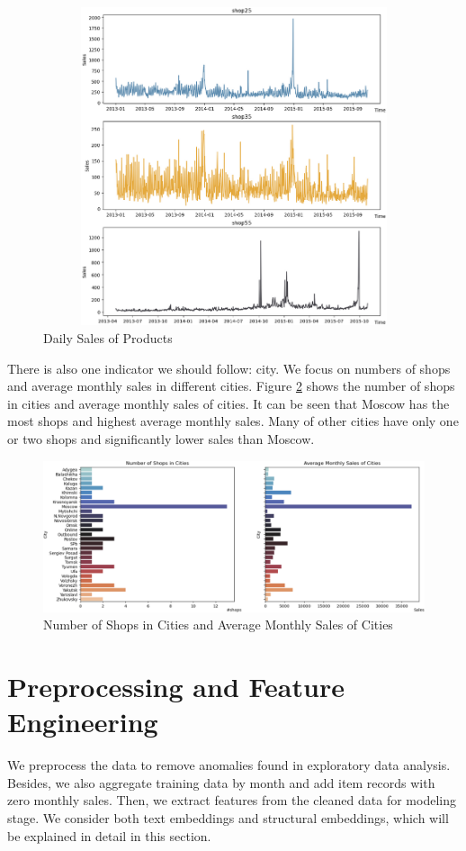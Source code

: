 \documentclass{article}
\begin{document}
\begin{figure}[!ht]
    \centering
    \includegraphics[width=12cm, height=9.35cm]{./figs/shop-sales.png}
    \caption{Daily Sales of Products}
    \label{fig:shop-sales}
\end{figure}

There is also one indicator we should follow: city. We focus on numbers of shops and average monthly sales in different cities. Figure \ref{fig:city} shows the number of shops in cities and average monthly sales of cities. It can be seen that Moscow has the most shops and highest average monthly sales. Many of other cities have only one or two shops and significantly lower sales than Moscow.

\begin{figure}[!ht]
    \centering
    \includegraphics[width=16.5cm]{./figs/city-sales.png}
    \caption{Number of Shops in Cities and Average Monthly Sales of Cities}
    \label{fig:city}
\end{figure}

\section{Preprocessing and Feature Engineering}
We preprocess the data to remove anomalies found in exploratory data analysis. Besides, we also aggregate training data by month and add item records with zero monthly sales. Then, we extract features from the cleaned data for modeling stage. We consider both text embeddings and structural embeddings, which will be explained in detail in this section.
\end{document}
